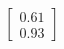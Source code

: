 \documentclass[preview]{standalone}
\begin{document}
\begin{align*}
\begin{bmatrix} 0.61 \\ 0.93 \end{bmatrix}
\end{align*}
\end{document}
